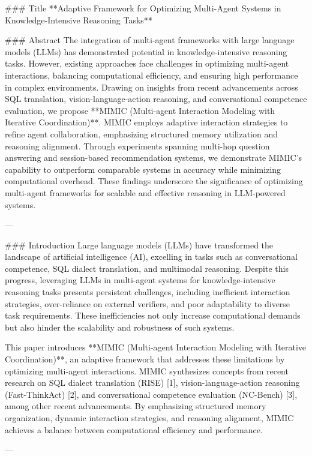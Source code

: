 ### Title
**Adaptive Framework for Optimizing Multi-Agent Systems in Knowledge-Intensive Reasoning Tasks**

### Abstract
The integration of multi-agent frameworks with large language models (LLMs) has demonstrated potential in knowledge-intensive reasoning tasks. However, existing approaches face challenges in optimizing multi-agent interactions, balancing computational efficiency, and ensuring high performance in complex environments. Drawing on insights from recent advancements across SQL translation, vision-language-action reasoning, and conversational competence evaluation, we propose **MIMIC (Multi-agent Interaction Modeling with Iterative Coordination)**. MIMIC employs adaptive interaction strategies to refine agent collaboration, emphasizing structured memory utilization and reasoning alignment. Through experiments spanning multi-hop question answering and session-based recommendation systems, we demonstrate MIMIC’s capability to outperform comparable systems in accuracy while minimizing computational overhead. These findings underscore the significance of optimizing multi-agent frameworks for scalable and effective reasoning in LLM-powered systems.

---

### Introduction
Large language models (LLMs) have transformed the landscape of artificial intelligence (AI), excelling in tasks such as conversational competence, SQL dialect translation, and multimodal reasoning. Despite this progress, leveraging LLMs in multi-agent systems for knowledge-intensive reasoning tasks presents persistent challenges, including inefficient interaction strategies, over-reliance on external verifiers, and poor adaptability to diverse task requirements. These inefficiencies not only increase computational demands but also hinder the scalability and robustness of such systems.

This paper introduces **MIMIC (Multi-agent Interaction Modeling with Iterative Coordination)**, an adaptive framework that addresses these limitations by optimizing multi-agent interactions. MIMIC synthesizes concepts from recent research on SQL dialect translation (RISE) [1], vision-language-action reasoning (Fast-ThinkAct) [2], and conversational competence evaluation (NC-Bench) [3], among other recent advancements. By emphasizing structured memory organization, dynamic interaction strategies, and reasoning alignment, MIMIC achieves a balance between computational efficiency and performance.

---

